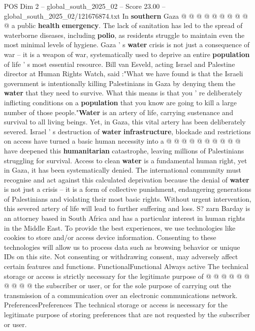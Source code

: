 \begin{textsample}{POS Dim 2 – global\_south\_2025\_02 – Score 23.00 – global\_south\_2025\_02/121676874.txt}
In \textbf{southern} Gaza @ @ @ @ @ @ @ @ @ @ a public \textbf{health} \textbf{emergency}.
The lack of sanitation has led to the spread of waterborne diseases, including \textbf{polio}, as residents struggle to maintain even the most minimal levels of hygiene.
Gaza ' s \textbf{water} crisis is not just a consequence of war -- it is a weapon of war, systematically used to deprive an entire \textbf{population} of life ' s most essential resource.
Bill van Esveld, acting Israel and Palestine director at Human Rights Watch, said :"What we have found is that the Israeli government is intentionally killing Palestinians in Gaza by denying them the \textbf{water} that they need to survive.
What this means is that you ' re deliberately inflicting conditions on a \textbf{population} that you know are going to kill a large number of those people."\textbf{Water} is an artery of life, carrying sustenance and survival to all living beings.
Yet, in Gaza, this vital artery has been deliberately severed.
Israel ' s destruction of \textbf{water} \textbf{infrastructure}, blockade and restrictions on access have turned a basic human necessity into a @ @ @ @ @ @ @ @ @ @ have deepened this \textbf{humanitarian} catastrophe, leaving millions of Palestinians struggling for survival.
Access to clean \textbf{water} is a fundamental human right, yet in Gaza, it has been systematically denied.
The international community must recognise and act against this calculated deprivation because the denial of \textbf{water} is not just a crisis -- it is a form of collective punishment, endangering generations of Palestinians and violating their most basic rights.
Without urgent intervention, this severed artery of life will lead to further suffering and loss.
S? zarn Barday is an attorney based in South Africa and has a particular interest in human rights in the Middle East.
To provide the best experiences, we use technologies like cookies to store and/or access device information.
Consenting to these technologies will allow us to process data such as browsing behavior or unique IDs on this site.
Not consenting or withdrawing consent, may adversely affect certain features and functions.
FunctionalFunctional Always active The technical storage or access is strictly necessary for the legitimate purpose of @ @ @ @ @ @ @ @ @ @ the subscriber or user, or for the sole purpose of carrying out the transmission of a communication over an electronic communications network.
PreferencesPreferences The technical storage or access is necessary for the legitimate purpose of storing preferences that are not requested by the subscriber or user.

\end{textsample}

